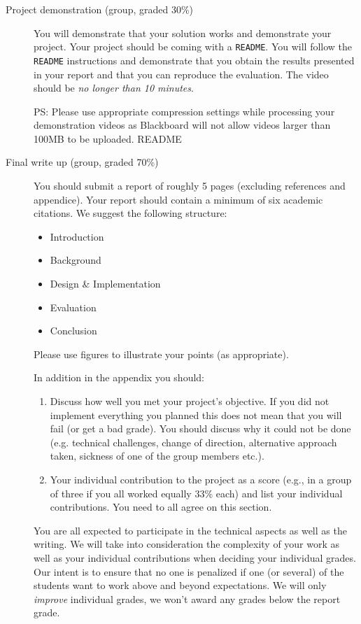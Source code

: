 \documentclass{article}
\begin{document}
\begin{description}
\item[Project demonstration (group, graded 30\%)]

  You will demonstrate that your solution works and demonstrate your
  project. Your project should be coming with a \texttt{README}. You will follow
  the \texttt{README} instructions and demonstrate that you obtain the results
  presented in your report and that you can reproduce the evaluation. The
  video should be \emph{no longer than 10 minutes}.

  PS: Please use appropriate compression settings while processing your
  demonstration videos as Blackboard will not allow videos larger than
  100MB to be uploaded.
  README
\item[Final write up (group, graded 70\%)]

  You should submit a report 
  of roughly 5 pages (excluding references and appendice). Your report
  should contain a minimum of six academic citations. We suggest the
  following structure:
  \begin{itemize}
  \item Introduction
  \item Background
  \item Design \& Implementation
  \item Evaluation
  \item Conclusion
  \end{itemize}

  Please use figures to illustrate your points (as appropriate).

  In addition in the appendix you should:
  \begin{enumerate}
  \item Discuss how well you met your project's objective. If
    you did not implement everything you planned this does not mean that you
    will fail (or get a bad grade). You should discuss why it could not be
    done (e.g. technical challenges, change of direction, alternative
    approach taken, sickness of one of the group members etc.).

  \item Your individual contribution to the project as a score (e.g., in
    a group of three if you all worked equally 33\% each) and list your
    individual contributions. You need to all agree on this section.
  \end{enumerate}

  You are all expected to participate in the technical aspects as well as
  the writing. We will take into consideration the complexity of your work
  as well as your individual contributions when deciding your individual
  grades. Our intent is to ensure that no one is penalized if one (or
  several) of the students want to work above and beyond expectations. We
  will only \emph{improve} individual grades, we won't
  award any grades below the report grade.
\end{description}
\end{document}
